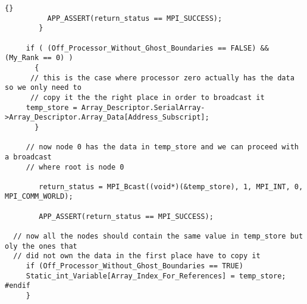 \documentclass[10pt]{llncs}
\begin{document}
\begin{lstlisting}{}
          APP_ASSERT(return_status == MPI_SUCCESS);
        }

     if ( (Off_Processor_Without_Ghost_Boundaries == FALSE) && (My_Rank == 0) )
       {
      // this is the case where processor zero actually has the data so we only need to
      // copy it the the right place in order to broadcast it
	 temp_store = Array_Descriptor.SerialArray->Array_Descriptor.Array_Data[Address_Subscript];
       }
     
     // now node 0 has the data in temp_store and we can proceed with a broadcast
     // where root is node 0

        return_status = MPI_Bcast((void*)(&temp_store), 1, MPI_INT, 0, MPI_COMM_WORLD);

        APP_ASSERT(return_status == MPI_SUCCESS);

  // now all the nodes should contain the same value in temp_store but oly the ones that
  // did not own the data in the first place have to copy it
     if (Off_Processor_Without_Ghost_Boundaries == TRUE)  
	 Static_int_Variable[Array_Index_For_References] = temp_store;
#endif
     }

\end{lstlisting}
\end{document}
